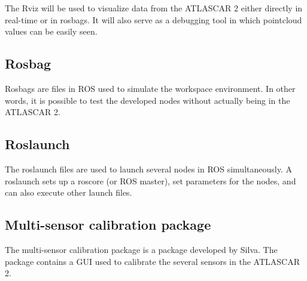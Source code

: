 The Rviz will be used to visualize data from the ATLASCAR 2 either directly in real-time or in rosbags. It will also serve as a debugging tool in which pointcloud values can be easily seen.

\subsection{Rosbag}
Rosbags are files in ROS used to simulate the workspace environment. In other words, it is possible to test the developed nodes without actually being in the ATLASCAR 2. %

\subsection{Roslaunch}
The roslaunch files are used to launch several nodes in ROS simultaneously. A roslaunch sets up a roscore (or ROS master), set parameters for the nodes, and can also execute other launch files. %

\subsection{Multi-sensor calibration package}

The multi-sensor calibration package is a package developed by Silva. The package contains a GUI used to calibrate the several sensors in the ATLASCAR 2. 